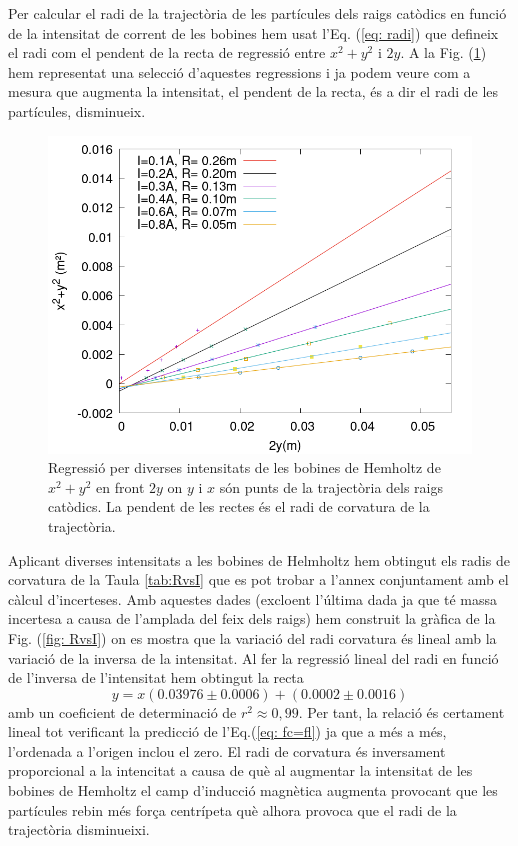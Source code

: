 \documentclass[11pt]{article}
\begin{document}
Per calcular el radi de la trajectòria de les partícules dels raigs catòdics en funció de la intensitat de corrent de les bobines hem usat l'Eq. (\ref{eq: radi}) que defineix el radi com el pendent de la recta de regressió entre $x^2+y^2$ i $2y$. A la Fig. (\ref{fig: regressio_1}) hem representat una selecció d'aquestes regressions i ja podem veure com a mesura que augmenta la intensitat, el pendent de la recta, és a dir el radi de les partícules, disminueix. 
\begin{figure}[H]
    \centering
    \includegraphics[scale=0.3]{regressio_1.png}
    \caption{Regressió per diverses intensitats de les bobines de Hemholtz de $x^2+y^2$ en front $2y$ on $y$ i $x$ són punts de la trajectòria dels raigs catòdics. La pendent de les rectes és el radi de corvatura de la trajectòria.}
    \label{fig: regressio_1}
\end{figure}
Aplicant diverses intensitats a les bobines de Helmholtz hem obtingut els radis de corvatura de la Taula \ref{tab:RvsI} que es pot trobar a l'annex conjuntament amb el càlcul d'incerteses. Amb aquestes dades (excloent l'última dada ja que té massa incertesa a causa de l'amplada del feix dels raigs) hem construit la gràfica de la Fig. (\ref{fig: RvsI}) on es mostra que la variació del radi corvatura és lineal amb la variació de la inversa de la intensitat. 
Al fer la regressió lineal del radi en funció de l'inversa de l'intensitat hem obtingut la recta
\begin{equation}
    y=x(0.03976\pm0.0006)+(0.0002\pm0.0016)
\end{equation}  
amb un coeficient de determinació de $r^2\approx0,99$. Per tant, la relació és certament lineal tot verificant la predicció de l'Eq.(\ref{eq: fc=fl}) ja que a més a més, l'ordenada a l'origen inclou el zero. El radi de corvatura és inversament proporcional a la intencitat a causa de què al augmentar la intensitat de les bobines de Hemholtz el camp d'inducció magnètica augmenta provocant que les partícules rebin més força centrípeta què alhora provoca que el radi de la trajectòria disminueixi.
\end{document}
